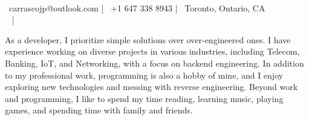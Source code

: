 \documentclass[]{awesome-cv}
\begin{document}
    
\begin{center}
	  \\
	\vspace{2mm}
	{\faEnvelope\ carrascojp@outlook.com} | {\faMobile\ +1 647 338 8943} | {\faMapMarker\ Toronto, Ontario, CA} \\ 
	{\faLinkedinSquare\ \color{darkblue}{https://www.linkedin.com/in/joao-carrasco/}} | {\faGithub\ \color{darkblue}{https://github.com/jpcrs/}} 
\end{center}

\begin{txtx}
As a developer, I prioritize simple solutions over over-engineered ones. I have experience working on diverse projects in various industries, including Telecom, Banking, IoT, and Networking, with a focus on backend engineering. In addition to my professional work, programming is also a hobby of mine, and I enjoy exploring new technologies and messing with reverse engineering. Beyond work and programming, I like to spend my time reading, learning music, playing games, and spending time with family and friends.
\end{txtx}
\end{document}
